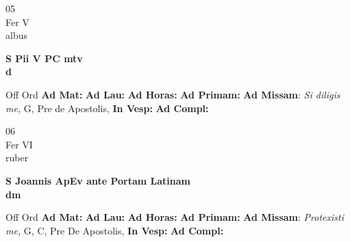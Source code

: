 \documentclass[10pt, openany]{book}
\begin{document}
    \begin{center}
        \begin{minipage}{3.5in}
            \vspace{2em}
            \begin{minipage}{0.5in}
                {\Huge 05} \\
                {\normalsize Fer V} \\
                {\normalsize albus}
            \end{minipage}
            \begin{minipage}{3.0in}
                \textbf{ \large S Pii V PC mtv \\
                \textnormal{\normalsize d}} \\ 
            \end{minipage}
            \begin{justify}Off Ord
                \textbf{Ad Mat: }
                \textbf{Ad Lau: }
                \textbf{Ad Horas: }
                \textbf{Ad Primam: }\textbf{Ad Missam}: \textit{Si diligis me,} G, Pre de Apostolis,  
                \textbf{In Vesp: }
                \textbf{Ad Compl: }
            \end{justify}
        \end{minipage}
    \end{center}

    \begin{center}
        \begin{minipage}{3.5in}
            \vspace{2em}
            \begin{minipage}{0.5in}
                {\Huge 06} \\
                {\normalsize Fer VI} \\
                {\normalsize ruber}
            \end{minipage}
            \begin{minipage}{3.0in}
                \textbf{ \large S Joannis ApEv ante Portam Latinam \\
                \textnormal{\normalsize dm}} \\ 
            \end{minipage}
            \begin{justify}Off Ord
                \textbf{Ad Mat: }
                \textbf{Ad Lau: }
                \textbf{Ad Horas: }
                \textbf{Ad Primam: }\textbf{Ad Missam}: \textit{Protexisti me,} G, C, Pre De Apostolis,  
                \textbf{In Vesp: }
                \textbf{Ad Compl: }
            \end{justify}
        \end{minipage}
    \end{center}
\end{document}
